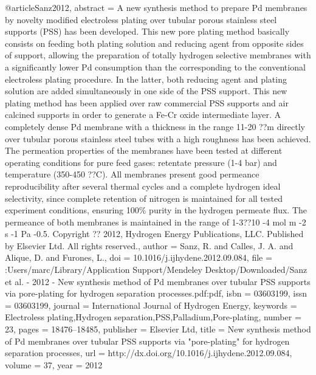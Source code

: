 @article{Sanz2012,
abstract = {A new synthesis method to prepare Pd membranes by novelty modified electroless plating over tubular porous stainless steel supports (PSS) has been developed. This new pore plating method basically consists on feeding both plating solution and reducing agent from opposite sides of support, allowing the preparation of totally hydrogen selective membranes with a significantly lower Pd consumption than the corresponding to the conventional electroless plating procedure. In the latter, both reducing agent and plating solution are added simultaneously in one side of the PSS support. This new plating method has been applied over raw commercial PSS supports and air calcined supports in order to generate a Fe-Cr oxide intermediate layer. A completely dense Pd membrane with a thickness in the range 11-20 ??m directly over tubular porous stainless steel tubes with a high roughness has been achieved. The permeation properties of the membranes have been tested at different operating conditions for pure feed gases: retentate pressure (1-4 bar) and temperature (350-450 ??C). All membranes present good permeance reproducibility after several thermal cycles and a complete hydrogen ideal selectivity, since complete retention of nitrogen is maintained for all tested experiment conditions, ensuring 100{\%} purity in the hydrogen permeate flux. The permeance of both membranes is maintained in the range of 1-3??10 -4 mol m -2 s -1 Pa -0.5. Copyright ?? 2012, Hydrogen Energy Publications, LLC. Published by Elsevier Ltd. All rights reserved.},
author = {Sanz, R. and Calles, J. A. and Alique, D. and Furones, L.},
doi = {10.1016/j.ijhydene.2012.09.084},
file = {:Users/marc/Library/Application Support/Mendeley Desktop/Downloaded/Sanz et al. - 2012 - New synthesis method of Pd membranes over tubular PSS supports via pore-plating for hydrogen separation processes.pdf:pdf},
isbn = {03603199},
issn = {03603199},
journal = {International Journal of Hydrogen Energy},
keywords = {Electroless plating,Hydrogen separation,PSS,Palladium,Pore-plating},
number = {23},
pages = {18476--18485},
publisher = {Elsevier Ltd},
title = {{New synthesis method of Pd membranes over tubular PSS supports via "pore-plating" for hydrogen separation processes}},
url = {http://dx.doi.org/10.1016/j.ijhydene.2012.09.084},
volume = {37},
year = {2012}
}
